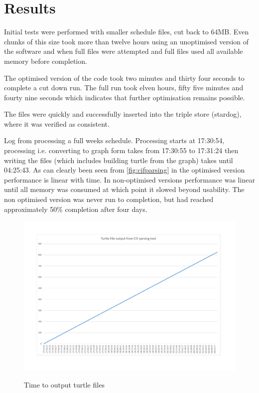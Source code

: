  \section{Results} 
 Initial tests were performed with smaller schedule files, cut back to 64MB. Even chunks of this size took more than twelve hours using an unoptimised version of the software and when full files were attempted and full files used all available memory before completion. 

The optimised version of the code took two minutes and thirty four seconds to complete a cut down run. The full run took elven hours, fifty five minutes and fourty nine seconds which indicates that further optimisation remains possible. 

The files were quickly and successfully inserted into the triple store (stardog), where it was verified as consistent. 

Log from processing a full weeks schedule.
Processing starts at 17:30:54, processing i.e. converting to graph form takes from 17:30:55 to 17:31:24 then writing the files (which includes building turtle from the graph) takes until 04:25:43. As can clearly been seen from \autoref{fig:cifparsing} in the optimised version performance is linear with time.  In non-optimised versions performance was linear until all memory was consumed at which point it slowed beyond usability. The non optimised version was never run to completion, but had reached approximately 50\% completion after four days. 

 \begin{figure}
\myfloatalign
{\includegraphics[width=\linewidth]{gfx/scheduleProcessing}} 
\caption{Time to output turtle files}
\label{fig:cifparsing}
\end{figure}

